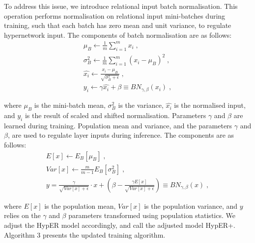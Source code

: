 \noindent To address this issue, we introduce relational input batch normalisation. This operation performs normalisation on relational input mini-batches during training, such that each batch has zero mean and unit variance, to regulate hypernetwork input. The components of batch normalisation are as follows: 
\begin{subequations}
	\begin{gather}
		\mu_B \gets \frac{1}{m} \sum_{i=1}^m x_i \; , \\
		\sigma_B^2 \gets \frac{1}{m} \sum_{i=1}^m (x_i - \mu_B)^2 \; , \\
		\hat{x_i} \gets \frac{x_i - \mu_B}{\sqrt{\sigma_B^2 + \epsilon}} \; , \\
		y_i \gets \gamma \hat{x_i} + \beta \equiv BN_{\gamma, \beta}(x_i) \; ,
	\end{gather}
\end{subequations}

\noindent where $ \mu_B $ is the mini-batch mean, $ \sigma_B^2 $ is the variance, $ \hat{x_i} $ is the normalised input, and $ y_i $ is the result of scaled and shifted normalisation. Parameters $ \gamma $ and $ \beta $ are learned during training. Population mean and variance, and the parameters $ \gamma $ and $ \beta $, are used to regulate layer inputs during inference. The components are as follows: 
\begin{subequations}
	\begin{gather}
		E[x] \gets E_B[\mu_B] \; , \\
		Var[x] \gets \frac{m}{m - 1} E_B[\sigma_B^2] \; , \\
		y = \frac{\gamma}{\sqrt{Var[x] + \epsilon}} \cdot x + \left(\beta - \frac{\gamma E[x]}{\sqrt{Var[x] + \epsilon}}\right) \equiv BN_{\gamma, \beta}(x) \; ,
	\end{gather}
\end{subequations}

\noindent where $ E[x] $ is the population mean, $ Var[x] $ is the population variance, and $ y $ relies on the $ \gamma $ and $ \beta $ parameters transformed using population statistics. We adjust the HypER model accordingly, and call the adjusted model HypER+. Algorithm 3 presents the updated training algorithm. \par

